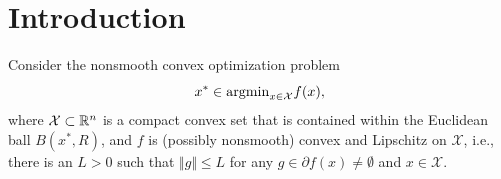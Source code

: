 

\author{Zhihan Zhu \and Yanhao Zhang \and Yong Xia %
}



\date{Received: date / Accepted: date}
\maketitle

\begin{abstract}
We establish the optimal ergodic convergence rate for the classical projected subgradient method with  time-varying step-sizes. This convergence rate remains the same even if we slightly increase the weight of the most recent points, thereby relaxing the ergodic sense.
\end{abstract}

\section{Introduction}
Consider the nonsmooth convex optimization problem
\begin{equation*}
	x^*\in{\rm argmin}_{x\in\mathcal{X}}f(x),
\end{equation*}
where $\mathcal{X}\subset{\mathbb R}^n$ is a compact convex set that is contained within the Euclidean ball $B(x^*,R)$, and $f$ is (possibly nonsmooth) convex and Lipschitz on $\mathcal{X}$, i.e., there is an $L>0$ such that $\Vert g\Vert\le L$ for any $g\in\partial f(x)\neq\emptyset$ and $x\in \mathcal{X}$.

